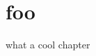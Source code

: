\documentclass[a4paper,11pt,oneside,master,english]{cimt}
\begin{document}
%
\frontmatter
%
\maketitle
%

%
\tableofcontents
%
\mainmatter
%

%

\section{foo}
what a cool chapter
\end{document}
